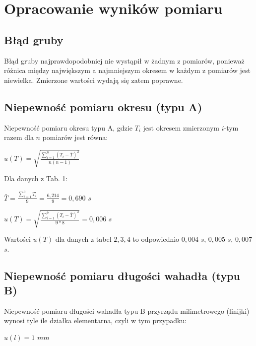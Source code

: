 \documentclass[12pt]{article}
\begin{document}
\section{Opracowanie wyników pomiaru}
\subsection{Błąd gruby}
Błąd gruby najprawdopodobniej nie wystąpił w żadnym z pomiarów, ponieważ różnica między największym a najmniejszym okresem w każdym z pomiarów 
jest niewielka. Zmierzone wartości wydają się zatem poprawne.
\subsection{Niepewność pomiaru okresu (typu A)}
Niepewność pomiaru okresu typu A, gdzie $T_i$  jest okresem zmierzonym $i$-tym razem dla $n$ pomiarów jest równa:
\begin{center}
\LARGE $ u(T) = \sqrt{\frac{\sum_{i=1}^{n}({T_i}-\bar{T})^2}{n(n-1)}} $
\end{center}
\newpage
Dla danych z Tab. 1:
\begin{center}
\LARGE $ \bar{T} = \frac{\sum_{i=1}^{9}{T_i}}{9} = \frac{6,214}{9} = 0,690 $ $ s $
\end{center}
\begin{center}
\LARGE $ u(T) =  \sqrt{\frac{\sum_{i=1}^{9}({T_i}-\bar{T})^2}{9*8}} = 0,006  $ $ s $
\end{center}
Wartości $u(T)$ dla danych z tabel $2,3,4$ to odpowiednio $0,004$ $s$, $0,005$ $s$, $0,007$ $s$.
\subsection{Niepewność pomiaru długości wahadła (typu B)}
Niepewność pomiaru długości wahadła typu B przyrządu milimetrowego (linijki) wynosi tyle ile działka elementarna, czyli w tym przypadku:
\begin{center}
\LARGE $ u(l) = 1$ $ mm $
\end{center}
\end{document}
